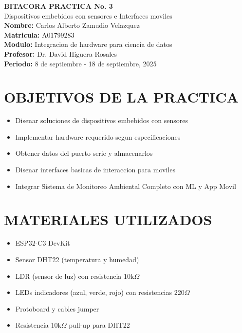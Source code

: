 \documentclass[11pt,letterpaper]{article}
\begin{document}
\begin{center}
    {\Large \textbf{BITACORA PRACTICA No. 3}}\\[0.3cm]
    {\large Dispositivos embebidos con sensores e Interfaces moviles}\\[0.5cm]
    \textbf{Nombre:} Carlos Alberto Zamudio Velazquez\\
    \textbf{Matricula:} A01799283\\
    \textbf{Modulo:} Integracion de hardware para ciencia de datos\\
    \textbf{Profesor:} Dr. David Higuera Rosales\\
    \textbf{Periodo:} 8 de septiembre - 18 de septiembre, 2025\\[0.5cm]
\end{center}

\section{OBJETIVOS DE LA PRACTICA}
\begin{itemize}
    \item Disenar soluciones de dispositivos embebidos con sensores
    \item Implementar hardware requerido segun especificaciones
    \item Obtener datos del puerto serie y almacenarlos
    \item Disenar interfaces basicas de interaccion para moviles
    \item Integrar Sistema de Monitoreo Ambiental Completo con ML y App Movil
\end{itemize}

\section{MATERIALES UTILIZADOS}
\begin{itemize}
    \item ESP32-C3 DevKit
    \item Sensor DHT22 (temperatura y humedad)
    \item LDR (sensor de luz) con resistencia 10k$\Omega$
    \item LEDs indicadores (azul, verde, rojo) con resistencias 220$\Omega$
    \item Protoboard y cables jumper
    \item Resistencia 10k$\Omega$ pull-up para DHT22
\end{itemize}
\end{document}
